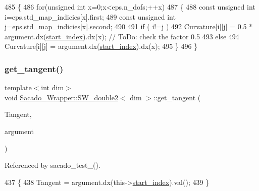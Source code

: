 \begin{DoxyCode}
485     \{
486         \textcolor{keywordflow}{for}(\textcolor{keywordtype}{unsigned} \textcolor{keywordtype}{int} x=0;x<eps.n\_dofs;++x)
487         \{
488             \textcolor{keyword}{const} \textcolor{keywordtype}{unsigned} \textcolor{keywordtype}{int} i=eps.std\_map\_indicies[x].first;
489             \textcolor{keyword}{const} \textcolor{keywordtype}{unsigned} \textcolor{keywordtype}{int} j=eps.std\_map\_indicies[x].second;
490 
491             \textcolor{keywordflow}{if} ( i!=j )
492                 Curvature[i][j] = 0.5 * argument.dx(\hyperlink{classSacado__Wrapper_1_1SW__double2_ae7327540ad1fd725ea78ffc2268b423a}{start\_index}).dx(x);  \textcolor{comment}{// ToDo: check the
       factor 0.5}
493             \textcolor{keywordflow}{else}
494                 Curvature[i][j] = argument.dx(\hyperlink{classSacado__Wrapper_1_1SW__double2_ae7327540ad1fd725ea78ffc2268b423a}{start\_index}).dx(x);
495         \}
496     \}
\end{DoxyCode}
\mbox{\label{classSacado__Wrapper_1_1SW__double2_ad51ba1e79171d60861b28098dfef903d}} 
\subsubsection{\texorpdfstring{get\+\_\+tangent()}{get\_tangent()}\hspace{0.1cm}{\footnotesize\ttfamily [1/2]}}
{\footnotesize\ttfamily template$<$int dim$>$ \\
void \hyperlink{classSacado__Wrapper_1_1SW__double2}{Sacado\+\_\+\+Wrapper\+::\+S\+W\+\_\+double2}$<$ dim $>$\+::get\+\_\+tangent (\begin{DoxyParamCaption}\item[{double \&}]{Tangent,  }\item[{Sacado\+::\+Fad\+::\+D\+Fad$<$ \hyperlink{Sacado__Wrapper_8h_a7e0893207b87dad05c66a34baac8ed2e}{D\+Fad\+Type} $>$ \&}]{argument }\end{DoxyParamCaption})}



Referenced by sacado\+\_\+test\+\_().


\begin{DoxyCode}
437     \{
438         Tangent = argument.dx(this->\hyperlink{classSacado__Wrapper_1_1SW__double2_ae7327540ad1fd725ea78ffc2268b423a}{start\_index}).val();
439     \}
\end{DoxyCode}
\mbox{\label{classSacado__Wrapper_1_1SW__double2_a9ee087929024da3da05268d5d0d4964b}} 
